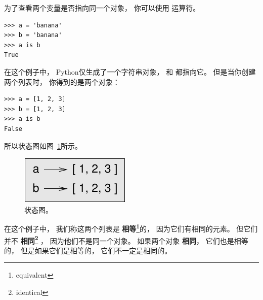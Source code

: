   


为了查看两个变量是否指向同一个对象， 你可以使用  运算符。

\begin{lstlisting}
>>> a = 'banana'
>>> b = 'banana'
>>> a is b
True
\end{lstlisting}

%

在这个例子中， Python仅生成了一个字符串对象，  和  都指向它。  但是当你创建两个列表时， 你得到的是两个对象：

\begin{lstlisting}
>>> a = [1, 2, 3]
>>> b = [1, 2, 3]
>>> a is b
False
\end{lstlisting}

%

所以状态图如图~\ref{fig.list2}所示。

  

\begin{figure}
\centerline
{\includegraphics[scale=0.8]{../source/figs/list2.pdf}}
\caption{状态图。}
\label{fig.list2}
\end{figure}


在这个例子中， 我们称这两个列表是 {\bf 相等\footnote{equivalent}}的， 因为它们有相同的元素。  但它们并不 {\bf 相同\footnote{identical}} ， 因为他们不是同一个对象。  如果两个对象 {\bf 相同}， 它们也是相等的， 但是如果它们是相等的， 它们不一定是相同的。

  

